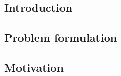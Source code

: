 \subsection*{Introduction}%
\label{subsec:Introduction}%
\subsection*{Problem formulation}%
\label{subsec:Problemformulation}%


%
\subsection*{Motivation}%
\label{subsec:Motivation}%


